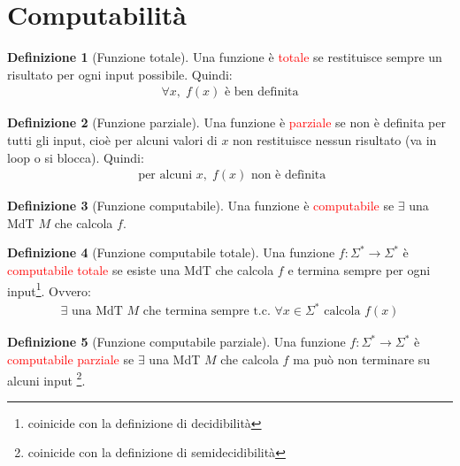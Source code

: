\documentclass{article}  %
\theoremstyle{definition}
\newtheorem{definition}{Definizione}[section]
\begin{document}
\section{Computabilità}
\begin{definition}[Funzione totale]
	Una funzione è \textcolor{red}{totale} se restituisce sempre un risultato per ogni input possibile. Quindi:
	\begin{align*}
		\forall x, \; f(x) \text{ è ben definita}
	\end{align*}
\end{definition}
\begin{definition}[Funzione parziale]
	Una funzione è \textcolor{red}{parziale} se non è definita per tutti gli input, cioè per alcuni valori di $x$ non restituisce nessun risultato (va in loop o si blocca).
	Quindi:
	\begin{align*}
		\text{ per alcuni } x, \; f(x) \text{ non è definita}
	\end{align*}
\end{definition}
\begin{definition}[Funzione computabile]
	Una funzione è \textcolor{red}{computabile} se $\exists$ una MdT $M$ che calcola $f$.
\end{definition}
\begin{definition}[Funzione computabile totale]
	Una funzione $f: \Sigma^* \rightarrow \Sigma^*$ è \textcolor{red}{computabile totale} se esiste una MdT che calcola $f$ e termina sempre per ogni input\footnote{
		coinicide con la definizione di decidibilità
	}.
	Ovvero:
	\begin{align*}
		\exists \text{ una MdT } M \text{ che termina sempre t.c. } \forall x \in \Sigma^* \text{ calcola } f(x)
	\end{align*}
\end{definition}
\begin{definition}[Funzione computabile parziale]
	Una funzione $f: \Sigma^* \rightarrow \Sigma^*$ è \textcolor{red}{computabile parziale} se $\exists$ una MdT $M$ che calcola $f$
	ma può non terminare su alcuni input \footnote{
		coinicide con la definizione di semidecidibilità
	}.
\end{definition}
\end{document}
